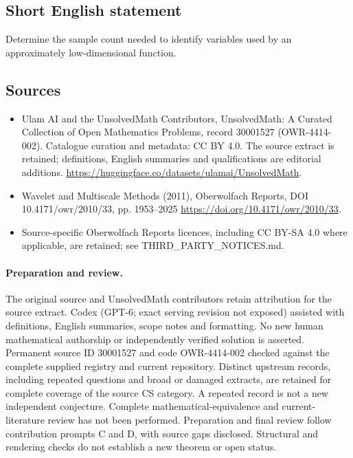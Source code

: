 \documentclass[11pt]{article}
\begin{document}
\subsection{Short English statement}
Determine the sample count needed to identify variables used by an approximately low-dimensional function.
\subsection{Sources}
\begin{itemize}
\item[\hypertarget{source:30001527:1}{S1}] Ulam AI and the UnsolvedMath Contributors, UnsolvedMath: A Curated Collection of Open Mathematics Problems, record 30001527 (OWR-4414-002). Catalogue curation and metadata: CC BY 4.0. The source extract is retained; definitions, English summaries and qualifications are editorial additions.
\url{https://huggingface.co/datasets/ulamai/UnsolvedMath}.
\item[\hypertarget{source:30001527:2}{S2}] Wavelet and Multiscale Methods (2011), Oberwolfach Reports, DOI 10.4171/owr/2010/33, pp. 1953--2025
\url{https://doi.org/10.4171/owr/2010/33}.
\item Source-specific Oberwolfach Reports licences, including CC BY-SA 4.0 where applicable, are retained; see THIRD\_PARTY\_NOTICES.md.
\end{itemize}
\paragraph{Preparation and review.}
The original source and UnsolvedMath contributors retain attribution for the source extract. Codex (GPT-6; exact serving revision not exposed) assisted with definitions, English summaries, scope notes and formatting. No new human mathematical authorship or independently verified solution is asserted. Permanent source ID 30001527 and code OWR-4414-002 checked against the complete supplied registry and current repository. Distinct upstream records, including repeated questions and broad or damaged extracts, are retained for complete coverage of the source CS category. A repeated record is not a new independent conjecture. Complete mathematical-equivalence and current-literature review has not been performed. Preparation and final review follow contribution prompts C and D, with source gaps disclosed. Structural and rendering checks do not establish a new theorem or open status.
\label{end:30001527}
\end{document}
